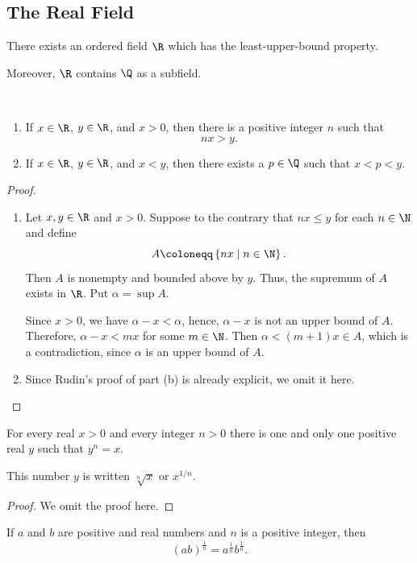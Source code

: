 \subsection{The Real Field}
\begin{theorem}
There exists an ordered field $\R$ which has the least-upper-bound property.

Moreover, $\R$ contains $\Q$ as a subfield.
\end{theorem}

\begin{theorem}
\,
\begin{enumerate}
\item[(a)] If $x \in \R$, $y \in \R$, and $x>0$, then there is a positive integer $n$ such that \[nx>y.\]
    \item[(b)] If $x \in \R$, $y \in \R$, and $x<y$, then there exists a $p \in \Q$ such that $x<p<y$.
\end{enumerate}
\end{theorem}
\begin{proof}
\,
\begin{enumerate}
\item[(a)] 
Let $x,y \in \R$ and $x>0$. 
Suppose to the contrary that $nx \leq y$ for each $n \in \N$ and define \[A \coloneqq \left\{nx \mid n \in \N \right\}.\] 
Then $A$ is nonempty and bounded above by $y$. 
Thus, the supremum of $A$ exists in $\R$. Put $\alpha = \sup A$.

Since $x>0$, we have $\alpha - x < \alpha$, hence, $\alpha-x$ is not an upper bound of $A$. Therefore, $\alpha-x<mx$ for some $m \in \N$. 
Then $\alpha < (m+1)x \in A$, which is a contradiction, since $\alpha$ is an upper bound of $A$.
\item[(b)]
Since Rudin's proof of part (b) is already explicit, we omit it here.
\end{enumerate}
\end{proof}
\begin{theorem}\label{thm:nth_square_root}
For every real $x>0$ and every integer $n>0$ there is one and only one positive real $y$ such that $y^n=x$.
\end{theorem}
This number $y$ is written $\sqrt[n]{x}$ or $x^{1/n}$. 
\begin{proof}
    We omit the proof here.
\end{proof}
\begin{corollary}\label{thm:associative_nth_sqrt}
If $a$ and $b$ are positive and real numbers and $n$ is a positive integer, then 
\[
(ab)^{\frac{1}{n}}=a^{\frac{1}{n}}b^{\frac{1}{n}}.
\]
\end{corollary}


